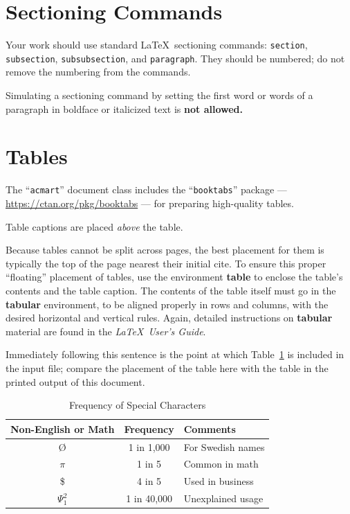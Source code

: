 \section{Sectioning Commands}

Your work should use standard \LaTeX\ sectioning commands:
\verb|section|, \verb|subsection|, \verb|subsubsection|, and
\verb|paragraph|. They should be numbered; do not remove the numbering
from the commands.

Simulating a sectioning command by setting the first word or words of
a paragraph in boldface or italicized text is {\bfseries not allowed.}

\section{Tables}

The ``\verb|acmart|'' document class includes the ``\verb|booktabs|''
package --- \url{https://ctan.org/pkg/booktabs} --- for preparing
high-quality tables.

Table captions are placed {\itshape above} the table.

Because tables cannot be split across pages, the best placement for
them is typically the top of the page nearest their initial cite.  To
ensure this proper ``floating'' placement of tables, use the
environment \textbf{table} to enclose the table's contents and the
table caption.  The contents of the table itself must go in the
\textbf{tabular} environment, to be aligned properly in rows and
columns, with the desired horizontal and vertical rules.  Again,
detailed instructions on \textbf{tabular} material are found in the
\textit{\LaTeX\ User's Guide}.

Immediately following this sentence is the point at which
Table~\ref{tab:freq} is included in the input file; compare the
placement of the table here with the table in the printed output of
this document.

\begin{table}
	\caption{Frequency of Special Characters}
	\label{tab:freq}
	\begin{tabular}{ccl}
		\toprule
		Non-English or Math & Frequency   & Comments          \\
		\midrule
		\O                  & 1 in 1,000  & For Swedish names \\
		$\pi$               & 1 in 5      & Common in math    \\
		\$                  & 4 in 5      & Used in business  \\
		$\Psi^2_1$          & 1 in 40,000 & Unexplained usage \\
		\bottomrule
	\end{tabular}
\end{table}

